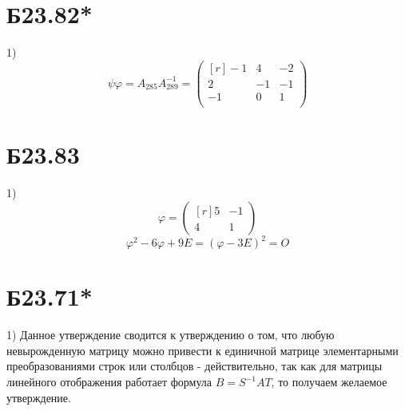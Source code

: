 \documentclass[a4paper,12pt]{article} %
\begin{document}
\section*{Б23.82*}1) $$\psi\varphi=A_{285}A^{-1}_{289}=\begin{pmatrix*}[r]
    -1&4&-2\\
    2&-1&-1\\
    -1&0&1\\
\end{pmatrix*}$$
\section*{Б23.83}1)$$\varphi=\begin{pmatrix*}[r]
    5&-1\\
    4&1
\end{pmatrix*}$$
$$\varphi^2-6\varphi+9E=(\varphi-3E)^2=O$$
\section*{Б23.71*}1) Данное утверждение сводится к утверждению о том, что любую невырожденную матрицу можно привести к единичной матрице элементарными преобразованиями строк или столбцов - действительно, так как для матрицы линейного отображения работает формула $B=S^{-1}AT$, то получаем желаемое утверждение.
\end{document}
